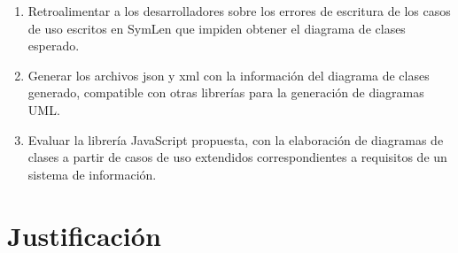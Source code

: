 \begin{enumerate}
	
	\item Retroalimentar a los desarrolladores sobre los errores de escritura de los casos de uso escritos en SymLen que impiden obtener el diagrama de clases esperado.
	
	
	\item Generar los archivos json y xml con la información del diagrama de clases generado, compatible con otras librerías para la generación de diagramas UML.  
	
	\item Evaluar la librería JavaScript propuesta, con la elaboración de diagramas de clases a partir de casos de uso extendidos correspondientes a requisitos de un sistema de información.
\end{enumerate}

\section{Justificación}

%


